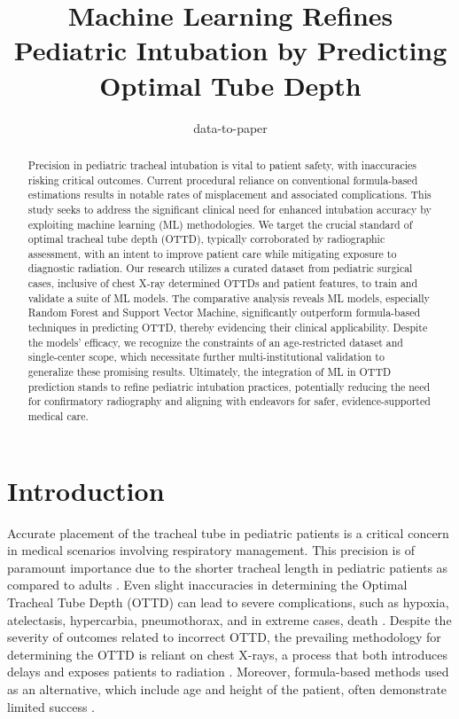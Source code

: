 \documentclass[11pt]{article}
\title{Machine Learning Refines Pediatric Intubation by Predicting Optimal Tube Depth}
\author{data-to-paper}
\begin{document}
\maketitle
\begin{abstract}
Precision in pediatric tracheal intubation is vital to patient safety, with inaccuracies risking critical outcomes. Current procedural reliance on conventional formula-based estimations results in notable rates of misplacement and associated complications. This study seeks to address the significant clinical need for enhanced intubation accuracy by exploiting machine learning (ML) methodologies. We target the crucial standard of optimal tracheal tube depth (OTTD), typically corroborated by radiographic assessment, with an intent to improve patient care while mitigating exposure to diagnostic radiation. Our research utilizes a curated dataset from pediatric surgical cases, inclusive of chest X-ray determined OTTDs and patient features, to train and validate a suite of ML models. The comparative analysis reveals ML models, especially Random Forest and Support Vector Machine, significantly outperform formula-based techniques in predicting OTTD, thereby evidencing their clinical applicability. Despite the models' efficacy, we recognize the constraints of an age-restricted dataset and single-center scope, which necessitate further multi-institutional validation to generalize these promising results. Ultimately, the integration of ML in OTTD prediction stands to refine pediatric intubation practices, potentially reducing the need for confirmatory radiography and aligning with endeavors for safer, evidence-supported medical care.
\end{abstract}
\section*{Introduction}

Accurate placement of the tracheal tube in pediatric patients is a critical concern in medical scenarios involving respiratory management. This precision is of paramount importance due to the shorter tracheal length in pediatric patients as compared to adults \cite{Kollef1994EndotrachealTM}. Even slight inaccuracies in determining the Optimal Tracheal Tube Depth (OTTD) can lead to severe complications, such as hypoxia, atelectasis, hypercarbia, pneumothorax, and in extreme cases, death \cite{Monnier2010PediatricAS}. Despite the severity of outcomes related to incorrect OTTD, the prevailing methodology for determining the OTTD is reliant on chest X-rays, a process that both introduces delays and exposes patients to radiation \cite{Kollef1994EndotrachealTM, Monnier2010PediatricAS}. Moreover, formula-based methods used as an alternative, which include age and height of the patient, often demonstrate limited success \cite{Mariano2005ACO, Takita2003TheHF}.
\end{document}

